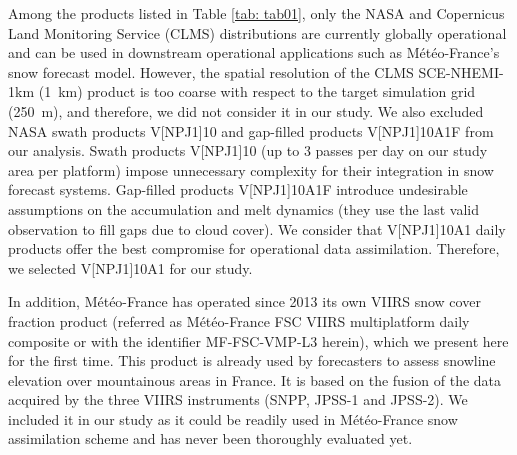 \documentclass[tc, manuscript]{copernicus}
\begin{document}
Among the products listed in Table \ref{tab: tab01}, only the NASA and Copernicus Land Monitoring Service (CLMS) distributions are currently globally operational and can be used in downstream operational applications such as Météo-France's snow forecast model. However, the spatial resolution of the CLMS SCE-NHEMI-1km (1~km) product is too coarse with respect to the target simulation grid (250~m), and therefore, we did not consider it in our study. 
We also excluded NASA swath products V[NP\textbar J1]10 and gap-filled products V[NP\textbar J1]10A1F from our analysis. Swath products V[NP\textbar J1]10 (up to 3 passes per day on our study area per platform) impose unnecessary complexity for their integration in snow forecast systems. Gap-filled products V[NP\textbar J1]10A1F introduce undesirable assumptions on the accumulation and melt dynamics (they use the last valid observation to fill gaps due to cloud cover). We consider that V[NP\textbar J1]10A1 daily products offer the best compromise for operational data assimilation. Therefore, we selected V[NP\textbar J1]10A1 for our study.

In addition, Météo-France has operated since 2013 its own VIIRS snow cover fraction product (referred as Météo-France FSC  VIIRS multiplatform daily composite or with the identifier MF-FSC-VMP-L3 herein), which we present here for the first time. This product is already used by forecasters to assess snowline elevation over mountainous areas in France. It is based on the fusion of the data acquired by the three VIIRS instruments (SNPP, JPSS-1 and JPSS-2). We included it in our study as it could be readily used in Météo-France snow assimilation scheme \citep{cluzet_croco_v10_2021} and has never been thoroughly evaluated yet. 
\end{document}
